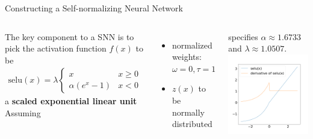 \documentclass[aspectratio=169]{beamer}
\begin{document}
\begin{frame}{Constructing a Self-normalizing Neural Network}
\begin{columns}
The key component to a SNN is to pick the activation function $f(x)$ to be
\begin{align}
\text{selu}(x) = \lambda
\begin{cases} 
      x & x\geq 0 \\
      \alpha ( e^x - 1) & x < 0
   \end{cases}
\end{align}
a \textbf{scaled exponential linear unit}
\\
Assuming 
\begin{itemize}
\item normalized weights: $\omega = 0, \tau = 1$ 
\item $z(x)$ to be normally distributed
\end{itemize}
specifies $ \alpha \approx 1.6733 $ and $ \lambda \approx 1.0507 $. 
	\includegraphics[width=\linewidth]{images/selu.png}
\end{columns}

\end{frame}
\end{document}
